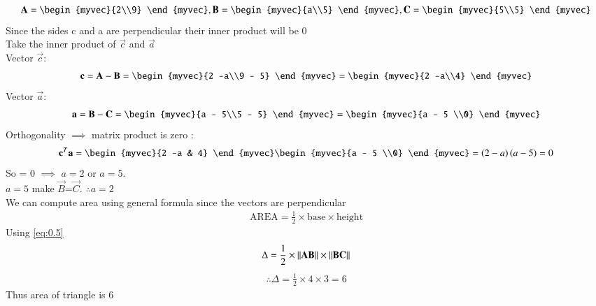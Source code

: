 \documentclass[journal]{IEEEtran}
\begin{document}
	\begin{align}
		\vec{A} = \begin{myvec}{2\\9} \end{myvec} , \vec{B} = \begin{myvec}{a\\5} \end{myvec}, \vec{C} = \begin{myvec}{5\\5} \end{myvec}
	\end{align}
	Since the sides c and a are perpendicular their inner product will be 0\\
	Take the inner product of $\vec{c}$ and $\vec{a}$\\
	Vector $\vec{c}$:
	\begin{align}
		\vec{c} = \vec{A}-\vec{B} = \begin{myvec}{2 -a\\9 - 5} \end{myvec} = \begin{myvec}{2 -a\\4} \end{myvec}
	\end{align}
	Vector $\vec{a}$:
	\begin{align}
		\vec{a} = \vec{B}-\vec{C} = \begin{myvec}{a - 5\\5 - 5} \end{myvec} = \begin{myvec}{a - 5 \\0} \end{myvec}
	\end{align}
	Orthogonality $\implies$ matrix product is zero :
	\begin{align}
	\vec{c}^T\vec{a} = \begin{myvec}{2 -a & 4} \end{myvec}\begin{myvec}{a - 5 \\0} \end{myvec} = \brak{2-a}\brak{a-5} = 0
	\end{align}
	So  = 0 $\implies$ $a = 2$ or $a = 5$.\\
	$a = 5$ make $\vec{B}$=$\vec{C}$. $\therefore a =2$  \\
	We can compute area using general formula since the vectors are perpendicular
	\begin{align}
		\text{AREA} = \frac{1}{2}\times\text{base}\times\text{height} \label{eq:0.5}
	\end{align}
	Using \eqref{eq:0.5}
	\begin{align}
	\Delta = \frac{1}{2}\times\left\lVert\mathbf{AB}\right\rVert\times\left\lVert\mathbf{BC}\right\rVert
	\end{align}
	\begin{align}
		\therefore	\Delta = \frac{1}{2}\times4\times3 = 6
	\end{align}
	Thus area of triangle is 6\\
\end{document}
